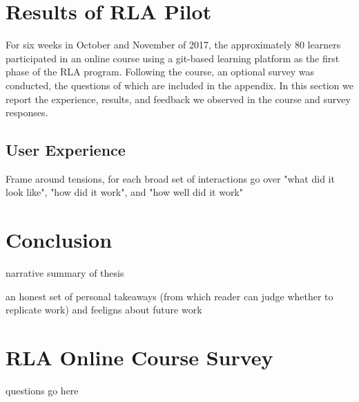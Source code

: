 \documentclass[12pt,twoside,vi]{mitthesis}
\newcommand{\wip}[1]{{\color{red} #1}}
\begin{document}
\chapter{Results of RLA Pilot}

For six weeks in October and November of 2017, the approximately 80 learners participated in an online course using a git-based learning platform as the first phase of the RLA program. Following the course, an optional survey was conducted, the questions of which are included in the appendix. In this section we report the experience, results, and feedback we observed in the course and survey responses.

\section{User Experience}

\wip{Frame around tensions, for each broad set of interactions go over "what did it look like", "how did it work", and "how well did it work"}

\chapter{Conclusion}

\wip{narrative summary of thesis

an honest set of personal takeaways (from which reader can judge whether to replicate work) and feeligns about future work}

\appendix
\chapter{RLA Online Course Survey}
\wip{questions go here}
\clearpage
\newpage
\begin{singlespace}
\nocite{*}
 

\end{singlespace}
\end{document}
